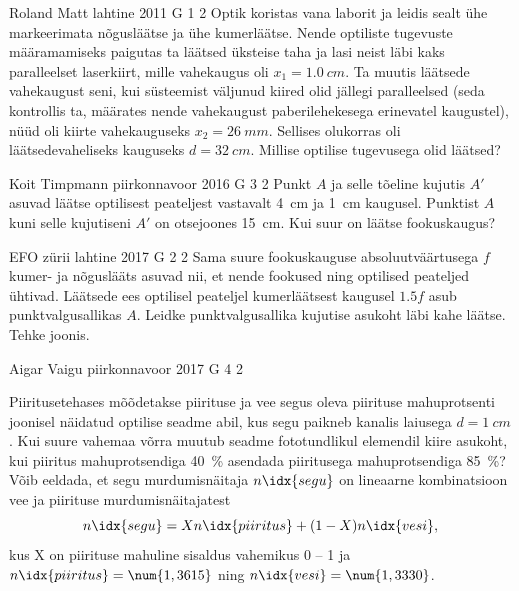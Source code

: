 \documentclass[11pt, twoside]{article}
\begin{document}
{%
{Roland Matt} %
{lahtine} %
{2011} %
{G 1} %
{2} %
{
\ifStatement
Optik koristas vana laborit ja leidis sealt ühe markeerimata nõgusläätse ja ühe
kumerläätse. Nende optiliste tugevuste määramamiseks paigutas ta läätsed
üksteise taha ja lasi neist läbi kaks paralleelset laserkiirt, mille vahekaugus
oli $x_{1}=\SI{1,0}{cm}$. Ta muutis läätsede vahekaugust seni, kui süsteemist väljunud
kiired olid jällegi paralleelsed (seda kontrollis ta, määrates nende vahekaugust
paberilehekesega erinevatel kaugustel), nüüd oli kiirte vahekauguseks
$x_{2}=\SI{26}{mm}$. Sellises olukorras oli läätsedevaheliseks kauguseks 
$d=\SI{32}{cm}$.
Millise optilise tugevusega olid läätsed?
\fi
}

{Koit Timpmann} %
{piirkonnavoor} %
{2016} %
{G 3} %
{2} %
{
\ifStatement
Punkt $A$ ja selle tõeline kujutis $A'$ asuvad läätse optilisest peateljest vastavalt \SI{4}{cm} ja \SI{1}{cm} kaugusel. Punktist $A$ kuni selle kujutiseni $A'$ on otsejoones \SI{15}{cm}. Kui suur on läätse fookuskaugus?
\fi
}

{EFO zürii} %
{lahtine} %
{2017} %
{G 2} %
{2} %
{
\ifStatement
Sama suure fookuskauguse absoluutväärtusega $f$ kumer- ja nõguslääts asuvad nii, et nende fookused ning optilised peateljed ühtivad. Läätsede ees optilisel peateljel kumerläätsest kaugusel $\num{1,5}f$ asub punktvalgusallikas $A$. Leidke punktvalgusallika kujutise asukoht läbi kahe läätse. Tehke joonis.
\fi
}

{Aigar Vaigu} %
{piirkonnavoor} %
{2017} %
{G 4} %
{2} %
{
\ifStatement
Piiritusetehases mõõdetakse piirituse ja vee segus oleva piirituse mahuprotsenti joonisel näidatud optilise seadme abil, kus segu paikneb kanalis laiusega $d=\SI{1}{cm}$. 
Kui suure vahemaa võrra muutub seadme fototundlikul elemendil kiire asukoht, kui piiritus mahuprotsendiga \SI{40}{\percent} asendada piiritusega mahuprotsendiga \SI{85}{\percent}?
Võib eeldada, et segu murdumisnäitaja $n\idx{segu}$ on lineaarne kombinatsioon vee ja piirituse murdumisnäitajatest
$$
n\idx{segu}=Xn\idx{piiritus}+(1-X)n\idx{vesi},
$$
kus X on piirituse mahuline sisaldus vahemikus 0 -- 1 ja $n\idx{piiritus}=\num{1,3615}$ ning $n\idx{vesi}=\num{1,3330}$.

}}
\end{document}
